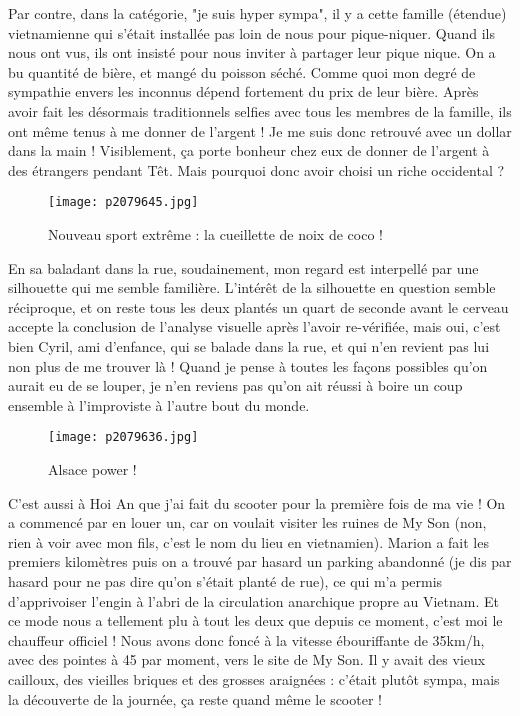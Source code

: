 \documentclass{book}
\begin{document}
Par contre, dans la catégorie, "je suis hyper sympa", il y a cette famille (étendue) vietnamienne qui s'était installée pas loin de nous pour pique-niquer. Quand ils nous ont vus, ils ont insisté pour nous inviter à partager leur pique nique. On a bu quantité de bière, et mangé du poisson séché. Comme quoi mon degré de sympathie envers les inconnus dépend fortement du prix de leur bière. Après avoir fait les désormais traditionnels selfies avec tous les membres de la famille, ils ont même tenus à me donner de l'argent ! Je me suis donc retrouvé avec un dollar dans la main ! Visiblement, ça porte bonheur chez eux de donner de l'argent à des étrangers pendant Têt. Mais pourquoi donc avoir choisi un riche occidental ?


\begin{figure}[h]
\centering
\texttt{[image: p2079645.jpg]}
\caption*{Nouveau sport extrême : la cueillette de noix de coco !}
\end{figure}

En sa baladant dans la rue, soudainement, mon regard est interpellé par une silhouette qui me semble familière. L'intérêt de la silhouette en question semble réciproque, et on reste tous les deux plantés un quart de seconde avant le cerveau accepte la conclusion de l'analyse visuelle après l'avoir re-vérifiée, mais oui, c'est bien Cyril, ami d'enfance, qui se balade dans la rue, et qui n'en revient pas lui non plus de me trouver là ! Quand je pense à toutes les façons possibles qu'on aurait eu de se louper, je n'en reviens pas qu'on ait réussi à boire un coup ensemble à l'improviste à l'autre bout du monde.


\begin{figure}[h]
\centering
\texttt{[image: p2079636.jpg]}
\caption*{Alsace power !}
\end{figure}

C'est aussi à Hoi An que j'ai fait du scooter pour la première fois de ma vie ! On a commencé par en louer un, car on voulait visiter les ruines de My Son (non, rien à voir avec mon fils, c'est le nom du lieu en vietnamien). Marion a fait les premiers kilomètres puis on a trouvé par hasard un parking abandonné (je dis par hasard pour ne pas dire qu'on s'était planté de rue), ce qui m'a permis d'apprivoiser l'engin à l'abri de la circulation anarchique propre au Vietnam. Et ce mode nous a tellement plu à tout les deux que  depuis ce moment, c'est moi le chauffeur officiel ! Nous avons donc foncé à la vitesse ébouriffante de 35km/h, avec des pointes à 45 par moment, vers le site de My Son. Il y avait des vieux cailloux, des vieilles briques et des grosses araignées : c'était plutôt sympa, mais la découverte de la journée, ça reste quand même le scooter !
\end{document}
